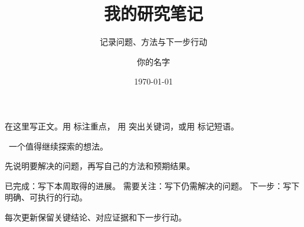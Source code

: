 \documentclass[11pt,a4paper,fontset=fandol]{ctexart}
\title{我的研究笔记}
\subtitle{记录问题、方法与下一步行动}
\author{你的名字}
\institute{课题组 / 单位}
\date{\today}
\begin{document}
\maketitle

在这里写正文。用  标注重点，
用  突出关键词，或用  标记短语。

~一个值得继续探索的想法。

\begin{tipbox}[核心想法]
先说明要解决的问题，再写自己的方法和预期结果。
\end{tipbox}

\begin{itemize}
  \gooditem 已完成：写下本周取得的进展。
  \warningitem 需要关注：写下仍需解决的问题。
  \arrowitem 下一步：写下明确、可执行的行动。
\end{itemize}

\begin{infobox}[记录方式]
每次更新保留关键结论、对应证据和下一步行动。
\end{infobox}
\end{document}
